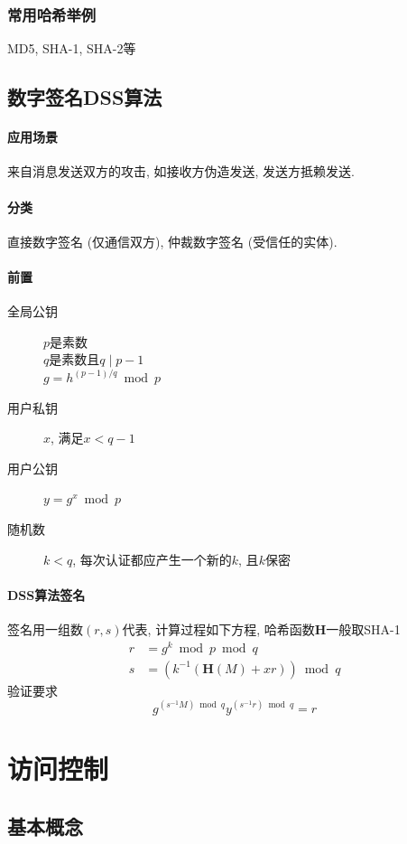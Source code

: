 \documentclass{ctexart}
\begin{document}
\subsubsection{常用哈希举例}  MD5, SHA-1, SHA-2等

\subsection{数字签名DSS算法}
\paragraph{应用场景} 来自消息发送双方的攻击, 如接收方伪造发送, 发送方抵赖发送.
\paragraph{分类} 直接数字签名 (仅通信双方), 仲裁数字签名 (受信任的实体).
\paragraph{前置} \begin{description}
    \item[全局公钥] $p$是素数\\ $q$是素数且$q \mid p -1$\\
        $g = h^{(p-1) / q} \bmod p$
    \item[用户私钥] $x$, 满足$x < q-1$
    \item[用户公钥] $y = g^x \bmod p$
    \item[随机数] $k < q$, 每次认证都应产生一个新的$k$, 且$k$保密
    \end{description}
\paragraph{DSS算法签名} 签名用一组数$(r, s)$代表, 计算过程如下方程, 哈希函数$\mathbf{H}$一般取SHA-1
    \begin{align*}
        r &= g^k \bmod p \bmod q\\
        s &= (k^{-1} (\mathbf{H}(M) + xr)) \bmod q
    \end{align*}验证要求 \begin{equation*}
        g^{(s^{-1} M) \bmod q} y^{(s^{-1} r) \bmod q} = r
    \end{equation*}

\section{访问控制}
\subsection{基本概念}
\end{document}
